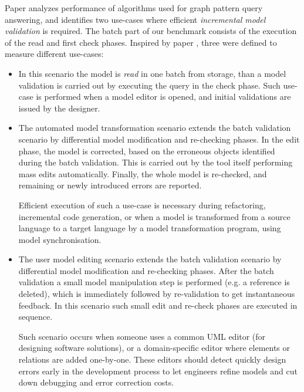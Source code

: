 Paper \cite{icgt08-bhrv} analyzes performance of algorithms used for graph
pattern query answering, and identifies two use-cases where efficient
\emph{incremental model validation} is required. The batch part of our benchmark
consists of the execution of the read and first check phases. Inspired by paper
\cite{icgt08-bhrv}, three  were defined to measure different
use-cases:
\begin{itemize}
  
  \item {}
  In this scenario the model is \emph{read} in one batch from storage, than a model validation is carried out by executing the query in the check phase. Such use-case is performed when a model editor is opened, and initial validations are issued by the designer. 
  
  \item {}
  The automated model transformation scenario extends the batch validation scenario by differential model modification and re-checking phases. In the edit phase, the model is corrected, based on the erroneous objects identified during the batch validation. This is carried out by the tool itself performing mass edits automatically. Finally, the whole model is re-checked, and remaining or newly introduced errors are reported. 
  
  Efficient execution of such a use-case is necessary during refactoring, incremental code generation, or when a model is transformed from a source language to a target language by a model transformation program, using model synchronisation.
  
  \item {}
  The user model editing scenario extends the batch validation scenario by differential model modification and re-checking phases. After the batch validation a small model manipulation step is performed (e.g. a reference is deleted), which is immediately followed by re-validation to get instantaneous feedback.  In this scenario such small edit and re-check phases are executed in sequence.
  
  Such scenario occurs when someone uses a common UML editor (for designing software solutions), or a domain-specific editor where elements or relations are added one-by-one. These editors should detect quickly design errors early in the development process to let engineers refine models and cut down debugging and error correction costs.
  
\end{itemize}



